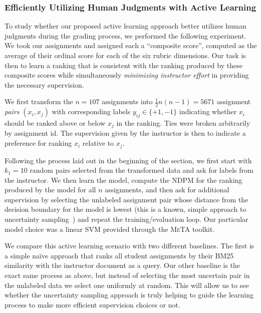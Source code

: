 \subsubsection{Efficiently Utilizing Human Judgments with Active Learning}
To study whether our proposed active learning approach better utilizes
human judgments during the grading process, we performed the following
experiment. We took our assignments and assigned each a ``composite
score'', computed as the average of their ordinal score for each of the six
rubric dimensions. Our task is then to learn a ranking that is consistent
with the ranking produced by these composite scores while simultaneously
\emph{minimizing instructor effort} in providing the necessary supervision.

We first transform the $n = 107$ assignments into $\frac{1}{2}n(n-1) =
5671$ assignment \emph{pairs} $(x_i, x_j)$ with corresponding labels
$y_{ij} \in \{+1, -1\}$ indicating whether $x_i$ should be ranked above or
below $x_j$ in the ranking. Ties were broken arbitrarily by assignment id.
The supervision given by the instructor is then to indicate a preference
for ranking $x_i$ relative to $x_j$.

Following the process laid out in the beginning of the section, we first
start with $k_1 = 10$ random pairs selected from the transformed data and
ask for labels from the instructor. We then learn the model, compute the
NDPM for the ranking produced by the model for all $n$ assignments, and
then ask for additional supervision by selecting the unlabeled assignment
pair whose distance from the decision boundary for the model is lowest
(this is a known, simple approach to uncertainty
sampling~\cite{Settles:2012}) and repeat the training/evaluation loop. Our
particular model choice was a linear SVM provided through the \textsc{MeTA}
toolkit.

We compare this active learning scenario with two different baselines. The
first is a simple na\"ive approach that ranks all student assignments by
their BM25 similarity with the instructor document as a query. Our other
baseline is the exact same process as above, but instead of selecting the
most uncertain pair in the unlabeled data we select one uniformly at
random. This will allow us to see whether the uncertainty sampling approach
is truly helping to guide the learning process to make more efficient
supervision choices or not.

